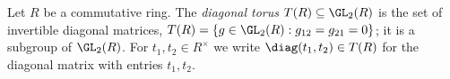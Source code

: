 Let $R$ be a commutative ring. The \emph{diagonal torus} $T(R)\subseteq\GL_2(R)$ is the set of invertible diagonal
matrices, $T(R)=\{g\in\GL_2(R):g_{12}=g_{21}=0\}$; it is a subgroup of $\GL_2(R)$. For $t_1,t_2\in R^\times$ we write
$\diag(t_1,t_2)\in T(R)$ for the diagonal matrix with entries $t_1,t_2$.
